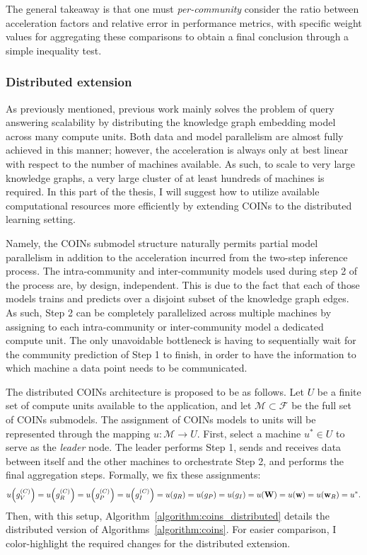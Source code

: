 The general takeaway is that one must \emph{per-community} consider the ratio between acceleration factors and relative error in performance metrics, with specific weight values for aggregating these comparisons to obtain a final conclusion through a simple inequality test.


\subsubsection{Distributed extension}

As previously mentioned, previous work mainly solves the problem of query answering scalability by distributing the knowledge graph embedding model across many compute units. Both data and model parallelism are almost fully achieved in this manner; however, the acceleration is always only at best linear with respect to the number of machines available. As such, to scale to very large knowledge graphs, a very large cluster of at least hundreds of machines is required. In this part of the thesis, I will suggest how to utilize available computational resources more efficiently by extending COINs to the distributed learning setting.

Namely, the COINs submodel structure naturally permits partial model parallelism in addition to the acceleration incurred from the two-step inference process. The intra-community and inter-community models used during step 2 of the process are, by design, independent. This is due to the fact that each of those models trains and predicts over a disjoint subset of the knowledge graph edges. As such, Step 2 can be completely parallelized across multiple machines by assigning to each intra-community or inter-community model a dedicated compute unit. The only unavoidable bottleneck is having to sequentially wait for the community prediction of Step 1 to finish, in order to have the information to which machine a data point needs to be communicated.

The distributed COINs architecture is proposed to be as follows. Let $U$ be a finite set of compute units available to the application, and let $\mathcal{M} \subset \mathcal{F}$ be the full set of COINs submodels. The assignment of COINs models to units will be represented through the mapping $u: \mathcal{M} \to U$. First, select a machine $u^* \in U$ to serve as the \emph{leader} node. The leader performs Step 1, sends and receives data between itself and the other machines to orchestrate Step 2, and performs the final aggregation steps. Formally, we fix these assignments:
\begin{equation}
u\mathopen{}\left(g_V^{\mathopen{}\left(C\right)}\right)=u\mathopen{}\left(g_R^{\mathopen{}\left(C\right)}\right)=u\mathopen{}\left(g_P^{\mathopen{}\left(C\right)}\right)=u\mathopen{}\left(g_I^{\mathopen{}\left(C\right)}\right)=u\mathopen{}\left(g_R\right)=u\mathopen{}\left(g_P\right)=u\mathopen{}\left(g_I\right)=u\mathopen{}\left(\mathbf{W}\right)=u\mathopen{}\left(\mathbf{w}\right)=u\mathopen{}\left(\mathbf{w}_R\right)=u^*.
\end{equation}
Then, with this setup, Algorithm~\ref{algorithm:coins_distributed} details the distributed version of Algorithms~\ref{algorithm:coins}. For easier comparison, I color-highlight the required changes for the distributed extension.

